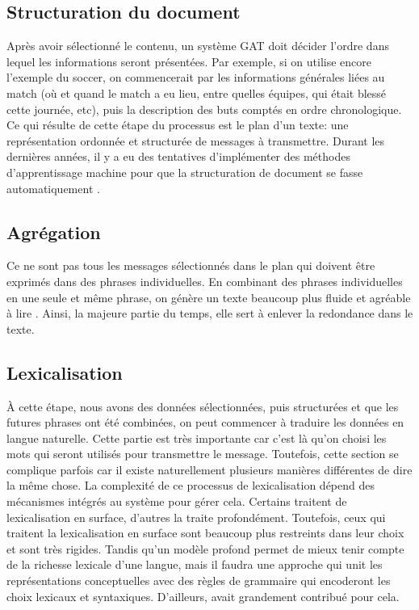 \subsection{Structuration du document}
Après avoir sélectionné le contenu, un système \ac{GAT} doit décider l'ordre dans lequel les informations seront présentées. Par exemple, si on utilise encore l'exemple du soccer, on commencerait par les informations générales liées au match (où et quand le match a eu lieu, entre quelles équipes, qui était blessé cette journée, etc), puis la description des buts comptés en ordre chronologique. Ce qui résulte de cette étape du processus est le plan d'un texte: une représentation ordonnée et structurée de messages à transmettre. Durant les dernières années, il y a eu des tentatives d'implémenter des méthodes d'apprentissage machine pour que la structuration de document se fasse automatiquement \citep{DimitromanolakiLearningOrderFacts2003}.

\subsection{Agrégation}
Ce ne sont pas tous les messages sélectionnés dans le plan qui doivent être exprimés dans des phrases individuelles. En combinant des phrases individuelles en une seule et même phrase, on génère un texte beaucoup plus fluide et agréable à lire \citep{ChengCapturingInteractionAggregation2000}. Ainsi, la majeure partie du temps, elle sert à enlever la redondance dans le texte. 

\subsection{Lexicalisation}
À cette étape, nous avons des données sélectionnées, puis structurées et que les futures phrases ont été combinées, on peut commencer à traduire les données en langue naturelle. Cette partie est très importante car c'est là qu'on choisi les mots qui seront utilisés pour transmettre le message. Toutefois, cette section se complique parfois car il existe naturellement plusieurs manières différentes de dire la même chose. La complexité de ce processus de lexicalisation dépend des mécanismes intégrés au système pour gérer cela. Certains traitent de lexicalisation en surface, d'autres la traite profondément. Toutefois, ceux qui traitent la lexicalisation en surface sont beaucoup plus restreints dans leur choix et sont très rigides. Tandis qu'un modèle profond permet de mieux tenir compte de la richesse lexicale d'une langue, mais il faudra une approche qui unit les représentations conceptuelles avec des règles de grammaire qui encoderont les choix lexicaux et syntaxiques. D'ailleurs, \citep{ElhadadFloatingConstraintsLexical1997} avait grandement contribué pour cela.

